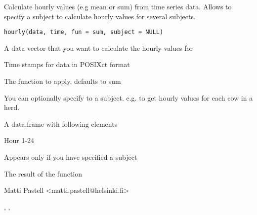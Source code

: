 \begin{Description}\relax
Calculate hourly values (e.g mean or sum) from time series data. Allows
to specify a subject to calculate hourly values for several subjects.
\end{Description}
\begin{Usage}
\begin{verbatim}
hourly(data, time, fun = sum, subject = NULL)
\end{verbatim}
\end{Usage}
\begin{Arguments}
\begin{ldescription}
\item[\code{data}] A data vector that you want to calculate the hourly values
for
\item[\code{time}] Time stamps for data in POSIXct format
\item[\code{fun}] The function to apply, defaults to sum
\item[\code{subject}] You can optionally specify to a subject. e.g. to get
hourly values for each cow in a herd.
\end{ldescription}
\end{Arguments}
\begin{Value}
A data.frame with following elements
\begin{ldescription}
\item[\code{Hour}] Hour 1-24
\item[\code{Subject}] Appears only if you have specified a subject
\item[\code{Result}] The result of the function
\end{ldescription}
\end{Value}
\begin{Author}\relax
Matti Pastell <matti.pastell@helsinki.fi>
\end{Author}
\begin{SeeAlso}\relax
{}, ,
\end{SeeAlso}
\begin{Examples}
\end{Examples}

